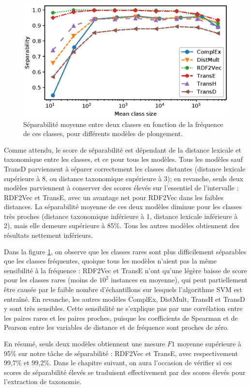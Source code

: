 \begin{figure}[h]
  \centering
  \includegraphics[width=0.8\linewidth]{fig/plot/separability2_type1.eps}
  \caption[Séparabilité moyenne en fonction de la fréquence des classes]{Séparabilité moyenne entre deux classes en fonction de la fréquence de ces classes, pour différents modèles de plongement.}
  \label{fig:separability-freq}
\end{figure}

Comme attendu, le score de séparabilité est dépendant de la distance lexicale et taxonomique entre les classes, et ce pour tous les modèles. Tous les modèles sauf TransD parviennent à séparer correctement les classes distantes (distance lexicale supérieure à 8, ou distance taxonomique supérieure à 3); en revanche, seuls deux modèles parviennent à conserver des scores élevés sur l'essentiel de l'intervalle : RDF2Vec et TransE, avec un avantage net pour RDF2Vec dans les faibles distances. La séparabilité moyenne de ces deux modèles diminue pour les classes très proches (distance taxonomique inférieure à 1, distance lexicale inférieure à 2), mais elle demeure supérieure à 85\%. Tous les autres modèles obtiennent des résultats nettement inférieurs.

Dans la figure \ref{fig:separability-freq}, on observe que les classes rares sont plus difficilement séparables que les classes fréquentes, quoique tous les modèles n'aient pas la même sensibilité à la fréquence : RDF2Vec et TransE n'ont qu'une légère baisse de score pour les classes rares (moins de $10^2$ instances en moyenne), qui peut partiellement être causée par le faible nombre d'échantillons sur lesquels l'algorithme SVM est entraîné. En revanche, les autres modèles ComplEx, DistMult, TransH et TransD y sont très sensibles. Cette sensibilité ne s'explique pas par une corrélation entre les paires rares et les paires proches, puisque les coefficients de Spearman et de Pearson entre les variables de distance et de fréquence sont proches de zéro.


En résumé, seuls deux modèles obtiennent une mesure $F1$ moyenne supérieure à 95\% sur notre tâche de séparabilité : RDF2Vec et TransE, avec respectivement 99,7\% et 99,2\%. Dans le chapitre suivant, on aura l'occasion de vérifier si ces scores de séparabilité élevés se traduisent effectivement par des scores élevés pour l'extraction de taxonomie.
